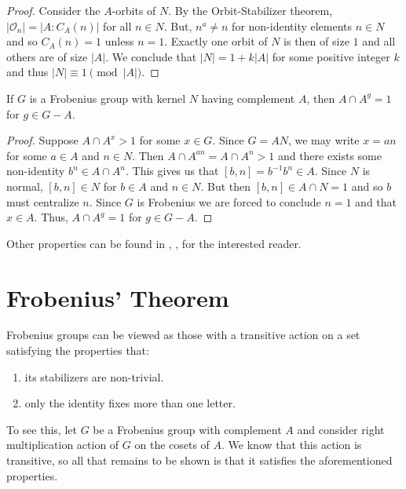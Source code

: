 \documentclass[main.tex]{subfiles}
\begin{document}
\begin{proof}
Consider the $A$-orbits of $N$. By the Orbit-Stabilizer theorem, $|\mathcal{O}_n| = |A : C_A(n)|$ for all $n \in N$. But, $n^a \ne n$ for non-identity elements $n \in N$ and so $C_A(n) = 1$ unless $n = 1$. Exactly one orbit of $N$ is then of size $1$ and all others are of size $|A|$. We conclude that $|N| = 1 + k |A|$ for some positive integer $k$ and thus $|N| \equiv 1 \pmod{|A|}$.
\end{proof}

\begin{lemma}\label{frobeniusdisjoint}
If $G$ is a Frobenius group with kernel $N$ having complement $A$, then $A \cap A^g = 1$ for $g \in G - A$.
\end{lemma}

\begin{proof}
Suppose $A \cap A^x > 1$ for some $x \in G$. Since $G = AN$, we may write $x = an$ for some $a \in A$ and $n \in N$. Then $A \cap A^{an} = A \cap A^n > 1$ and there exists some non-identity $b^n \in A \cap A^n$. This gives us that $[b,n] = b^{-1}b^n \in A$. Since $N$ is normal, $[b, n] \in N$ for $b \in A$ and $n \in N$. But then $[b,n] \in A \cap N = 1$ and so $b$ must centralize $n$. Since $G$ is Frobenius we are forced to conclude $n = 1$ and that $x \in A$. Thus, $A \cap A^g = 1$ for $g \in G - A$.
\end{proof}

Other properties can be found in \cite{isaacsfinitegrouptheory}, \cite{gorensteinfinitegroups}, \cite{isaacsalgebra} for the interested reader.

\hss

\section{Frobenius' Theorem}

\hss

Frobenius groups can be viewed as those with a transitive action on a set satisfying the properties that:
\begin{enumerate}
	\item its stabilizers are non-trivial.
	\item only the identity fixes more than one letter.
\end{enumerate}
To see this, let $G$ be a Frobenius group with complement $A$ and consider right multiplication action of $G$ on the cosets of $A$. We know that this action is transitive, so all that remains to be shown is that it satisfies the aforementioned properties.
\end{document}
